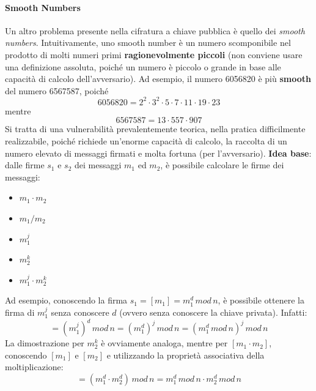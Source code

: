 \paragraph{Smooth Numbers}
Un altro problema presente nella cifratura a chiave pubblica è quello dei \textit{smooth numbers}. Intuitivamente, uno smooth number è un numero scomponibile nel prodotto di molti numeri primi \textbf{ragionevolmente piccoli} (non conviene usare una definizione assoluta, poiché un numero è piccolo o grande in base alle capacità di calcolo dell'avversario). Ad esempio, il numero 6056820 è più \textbf{smooth} del numero 6567587, poiché 
\begin{equation}
6056820 = 2^2 \cdot 3^2 \cdot 5 \cdot 7 \cdot 11 \cdot 19 \cdot 23
\end{equation}
mentre
\begin{equation}
6567587 = 13 \cdot 557 \cdot 907
\end{equation}
Si tratta di una vulnerabilità prevalentemente teorica, nella pratica difficilmente realizzabile, poiché richiede un'enorme capacità di calcolo, la raccolta di un numero elevato di messaggi firmati e molta fortuna (per l'avversario). 
\newline \newline
\textbf{Idea base}: dalle firme $s_{1}$ e $s_{2}$ dei messaggi $m_{1}$ ed $m_{2}$, è possibile calcolare le firme dei messaggi:
\begin{itemize}
\item $m_{1} \cdot m_{2}$
\item $m_{1}/m_{2}$
\item $m_{1}^j$
\item $m_{2}^k$ 
\item $m_{1}^j \cdot m_{2}^k$
\end{itemize} 
Ad esempio, conoscendo la firma $s_{1} = [m_{1}] = m_{1}^d \, mod \, n $, è possibile ottenere la firma di $m_{1}^j$ senza conoscere $d$ (ovvero senza conoscere la chiave privata). Infatti:
\begin{equation}
[m_1^j] = (m_{1}^j)^d \, mod \, n = (m_{1}^d)^j \, mod \, n = (m_{1}^d \, mod \, n)^j \, mod \, n
\end{equation} 
La dimostrazione per $m_{2}^k$  è ovviamente analoga, mentre per $[m_{1} \cdot m_{2}]$, conoscendo $[m_{1}]$ e $[m_{2}]$ e utilizzando la proprietà associativa della moltiplicazione:
\begin{equation}
[m_{1} \cdot m_{2}] = (m_{1}^d \cdot m_{2}^d) \, mod \, n = m_{1}^d \, mod \, n \cdot m_{2}^d \, mod \, n
\end{equation}
